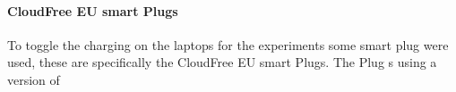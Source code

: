 \paragraph*{CloudFree EU smart Plugs}
To toggle the charging on the laptops for the experiments some smart plug were used, these are specifically the CloudFree EU smart Plugs. The Plug s using a version of 